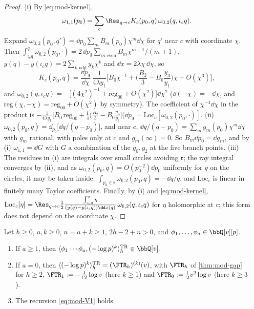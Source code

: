 \begin{proof}
(i) By \eqref{eq:mod-kernel},
\[
\omega_{1,1}(p_0)=\sum_c\Res_{q\to c}K_c(p_0,q)\,\omega_{0,2}(q,\iota_cq).
\]
Expand $\omega_{0,2}(p_0,q')=\dd p_0\sum_mB_m(p_0)\chi^m\dd\chi$ for $q'$ near $c$ with coordinate $\chi$. Then $\int_{\iota_cq}^q\omega_{0,2}(p_0,\cdot)=2\,\dd p_0\sum_{m\text{ even}}B_m\chi^{m+1}/(m+1)$, $y(q)-y(\iota_cq)=2\sum_{k\text{ odd}}y_k\chi^k$ and $\dd x=2\lambda\chi\,\dd\chi$, so
\[
K_c(p_0,q)=\frac{\dd p_0}{\dd\chi}\,\frac{1}{4\lambda y_1}\Big[B_0\chi^{-1}+\Big(\frac{B_2}{3}-B_0\frac{y_3}{y_1}\Big)\chi+O(\chi^3)\Big],
\]
and $\omega_{0,2}(q,\iota_cq)=-\big[(4\chi^2)^{-1}+\mathrm{reg}_{00}+O(\chi^2)\big]\dd\chi^2$ ($\dd(-\chi)=-\dd\chi$, and $\mathrm{reg}(\chi,-\chi)=\mathrm{reg}_{00}+O(\chi^2)$ by symmetry). The coefficient of $\chi^{-1}\dd\chi$ in the product is $-\frac{1}{4\lambda y_1}\big[B_0\,\mathrm{reg}_{00}+\frac14\big(\frac{B_2}{3}-B_0\frac{y_3}{y_1}\big)\big]\dd p_0=\mathrm{Loc}_c[\omega_{0,2}(p_0,\cdot)]$.
(ii) $\omega_{0,2}(p_0,q)=\dd_{p_0}\big[\dd q/(q-p_0)\big]$, and near $c$, $\dd q/(q-p_0)=\sum_mg_m(p_0)\chi^m\dd\chi$ with $g_m$ rational, with poles only at $c$ and $g_m(\infty)=0$. So $B_m\dd p_0=\dd g_m$, and by (i) $\omega_{1,1}=\dd G$ with $G$ a combination of the $g_0,g_2$ at the five branch points. (iii) The residues in (i) are integrals over small circles avoiding $\mathfrak r$; the ray integral converges by (ii), and as $\omega_{0,2}(p_0,q)=O(p_0^{-2})\dd p_0$ uniformly for $q$ on the circles, it may be taken inside: $\int_{p_0\in\mathfrak r}\omega_{0,2}(p_0,q)=-\dd q/q$, and $\mathrm{Loc}_c$ is linear in finitely many Taylor coefficients. Finally, by (i) and \eqref{eq:mod-kernel}, $\mathrm{Loc}_c[\eta]=\Res_{q\to c}\frac12\frac{\int_{\iota_cq}^q\eta}{(y(q)-y(\iota_cq))\dd x(q)}\,\omega_{0,2}(q,\iota_cq)$ for $\eta$ holomorphic at $c$; this form does not depend on the coordinate $\chi$.
\end{proof}

\begin{thm}[Theorem V]
\label{thm:mod-V}
Let $h\geq 0$, $a,k\geq 0$, $n=a+k\geq 1$, $2h-2+n>0$, and $\phi_1,\dots,\phi_a\in\bbQ[v][p]$.
\begin{enumerate}
\item If $a\geq 1$, then $\langle\phi_1\cdots\phi_a,(-\log p)^k\rangle^{\mathrm{TR}}_h\in\bbQ[v]$.
\item If $a=0$, then $\langle(-\log p)^k\rangle^{\mathrm{TR}}_h=(\FTR_h)^{(k)}(v)$, with $\FTR_h$ of \cref{thm:mod-gap} for $h\geq 2$, $\FTR_1:=-\frac1{12}\log v$ (here $k\geq 1$) and $\FTR_0:=\frac12v^2\log v$ (here $k\geq 3$).
\item The recursion \eqref{eq:mod-V1} holds.
\end{enumerate}
\end{thm}

